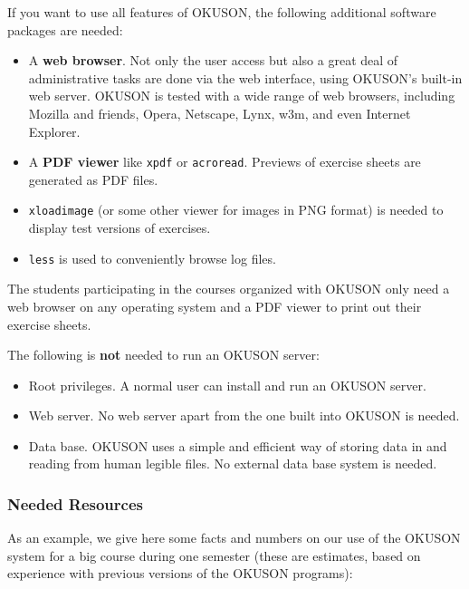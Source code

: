 \documentclass[12pt,openany,a4paper]{book}
\newcommand{\OKUSON}{\textsf{OKUSON}}
\begin{document}
If you want to use all features of {\OKUSON}, the following additional 
software packages are needed:
\begin{itemize}
\item A \textbf{web browser}. Not only the user access but also a great
deal of administrative tasks are done via the web interface, using
{\OKUSON}'s built-in web server. {\OKUSON} is tested with a wide range
of web browsers, including Mozilla and friends, Opera, Netscape, Lynx,
w3m, and even Internet Explorer.
\item A \textbf{PDF viewer} like \texttt{xpdf} or \texttt{acroread}. 
Previews of exercise sheets are generated as PDF files.
\item \texttt{xloadimage} (or some other viewer for images in PNG format) is 
needed to display test versions of exercises.
\item \texttt{less} is used to conveniently browse log files. 
\end{itemize}

The students participating in the courses organized with {\OKUSON} only 
need a web browser on any operating system and a PDF viewer to print out
their exercise sheets.

The following is \textbf{not} needed to run an {\OKUSON} server:
\begin{itemize}
\item Root privileges. A normal user can install and run an {\OKUSON}
server.
\item Web server. No web server apart from the one built into {\OKUSON} is
needed.
\item Data base. {\OKUSON} uses a simple and efficient way of storing
data in and reading from human legible files. No external data base
system is needed.
\end{itemize}

\subsubsection*{Needed Resources}

As an example, we give here some facts and numbers on our use of the
{\OKUSON} system for a big course during one semester (these are
estimates, based on experience with previous versions of the {\OKUSON}
programs):
\end{document}
